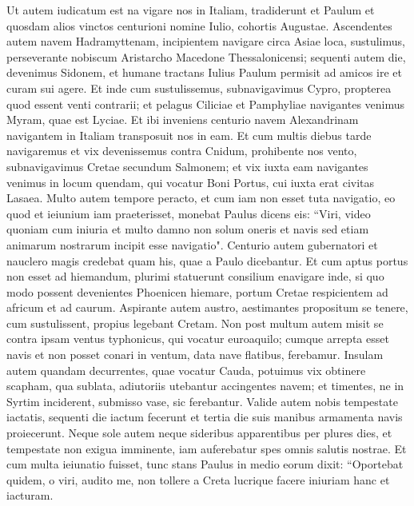\begin{biblechapter}  
\verse Ut autem iudicatum est na vigare nos in Italiam, tradiderunt et Paulum et quosdam alios vinctos centurioni nomine Iulio, cohortis Augustae. 
\verse Ascendentes autem navem Hadramyttenam, incipientem navigare circa Asiae loca, sustulimus, perseverante nobiscum Aristarcho Macedone Thessalonicensi; 
\verse sequenti autem die, devenimus Sidonem, et humane tractans Iulius Paulum permisit ad amicos ire et curam sui agere. 
\verse Et inde cum sustulissemus, subnavigavimus Cypro, propterea quod essent venti contrarii; 
\verse et pelagus Ciliciae et Pamphyliae navigantes venimus Myram, quae est Lyciae. 
\verse Et ibi inveniens centurio navem Alexandrinam navigantem in Italiam transposuit nos in eam. 
\verse Et cum multis diebus tarde navigaremus et vix devenissemus contra Cnidum, prohibente nos vento, subnavigavimus Cretae secundum Salmonem; 
\verse et vix iuxta eam navigantes venimus in locum quendam, qui vocatur Boni Portus, cui iuxta erat civitas Lasaea. 
\verse Multo autem tempore peracto, et cum iam non esset tuta navigatio, eo quod et ieiunium iam praeterisset, monebat Paulus  
\verse dicens eis: “Viri, video quoniam cum iniuria et multo damno non solum oneris et navis sed etiam animarum nostrarum incipit esse navigatio". 
\verse Centurio autem gubernatori et nauclero magis credebat quam his, quae a Paulo dicebantur.  
\verse Et cum aptus portus non esset ad hiemandum, plurimi statuerunt consilium enavigare inde, si quo modo possent devenientes Phoenicen hiemare, portum Cretae respicientem ad africum et ad caurum. 
\verse Aspirante autem austro, aestimantes propositum se tenere, cum sustulissent, propius legebant Cretam. 
\verse Non post multum autem misit se contra ipsam ventus typhonicus, qui vocatur euroaquilo; 
\verse cumque arrepta esset navis et non posset conari in ventum, data nave flatibus, ferebamur. 
\verse Insulam autem quandam decurrentes, quae vocatur Cauda, potuimus vix obtinere scapham, 
\verse qua sublata, adiutoriis utebantur accingentes navem; et timentes, ne in Syrtim inciderent, submisso vase, sic ferebantur. 
\verse Valide autem nobis tempestate iactatis, sequenti die iactum fecerunt 
\verse et tertia die suis manibus armamenta navis proiecerunt. 
\verse Neque sole autem neque sideribus apparentibus per plures dies, et tempestate non exigua imminente, iam auferebatur spes omnis salutis nostrae. 
\verse Et cum multa ieiunatio fuisset, tunc stans Paulus in medio eorum dixit: “Oportebat quidem, o viri, audito me, non tollere a Creta lucrique facere iniuriam hanc et iacturam. 

\end{biblechapter}
